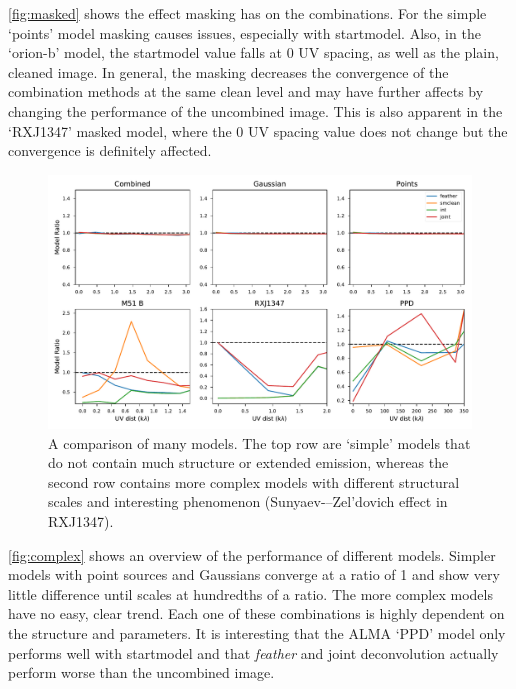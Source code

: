 \documentclass[preprint]{aastex63}
\begin{document}
\autoref{fig:masked} shows the effect masking has on the combinations. For the simple `points' model masking causes issues, especially with startmodel. Also, in the `orion-b' model, the startmodel value falls at \num{0} UV spacing, as well as the plain, cleaned image. In general, the masking decreases the convergence of the combination methods at the same clean level and may have further affects by changing the performance of the uncombined image. This is also apparent in the `RXJ1347' masked model, where the \num{0} UV spacing value does not change but the convergence is definitely affected.


\begin{figure}[ht]
    \includegraphics[width=\textwidth]{figures/complexity-plot}
    \caption{A comparison of many models. The top row are `simple' models that do not contain much structure or extended emission, whereas the second row contains more complex models with different structural scales and interesting phenomenon (Sunyaev-–Zel'dovich effect in RXJ1347).}
    \label{fig:complex}
\end{figure}

\autoref{fig:complex} shows an overview of the performance of different models. Simpler models with point sources and Gaussians converge at a ratio of \num{1} and show very little difference until scales at hundredths of a ratio. The more complex models have no easy, clear trend. Each one of these combinations is highly dependent on the structure and parameters. It is interesting that the ALMA `PPD' model only performs well with startmodel and that \textit{feather} and joint deconvolution actually perform worse than the uncombined image. 
\end{document}
